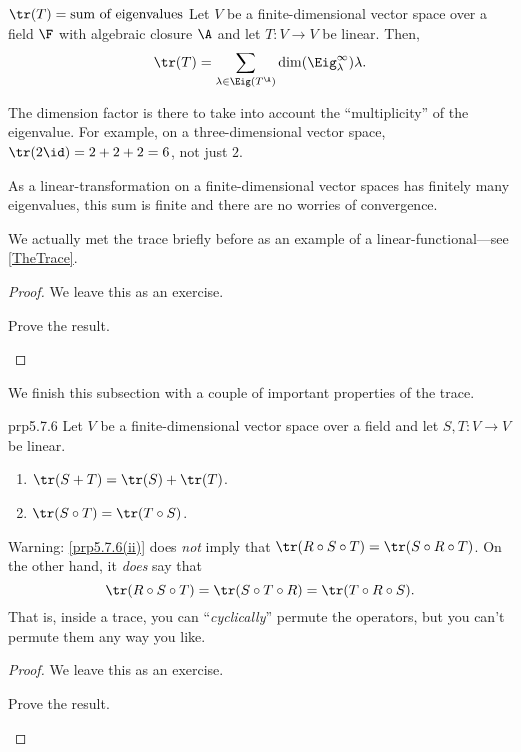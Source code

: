\begin{thm}{$\tr (T)=\text{sum of eigenvalues}$}{}
	Let $V$ be a finite-dimensional vector space over a field $\F$ with algebraic closure $\A$ and let $T\colon V\rightarrow V$ be linear.  Then,
	\begin{equation}
		\tr (T)=\sum _{\lambda \in \Eig (T^{\A})}\dim (\Eig _{\lambda}^{\infty})\lambda .
	\end{equation}
	\begin{rmk}
		The dimension factor is there to take into account the ``multiplicity'' of the eigenvalue.  For example, on a three-dimensional vector space, $\tr (2\id )=2+2+2=6$, not just $2$.
	\end{rmk}
	\begin{rmk}
		As a linear-transformation on a finite-dimensional vector spaces has finitely many eigenvalues, this sum is finite and there are no worries of convergence.
	\end{rmk}
	\begin{rmk}
		We actually met the trace briefly before as an example of a linear-functional---see \cref{TheTrace}.
	\end{rmk}
	\begin{proof}
		We leave this as an exercise.
		\begin{exr}[breakable=false]{}{}
			Prove the result.
		\end{exr}
	\end{proof}
\end{thm}
We finish this subsection with a couple of important properties of the trace.
\begin{prp}{}{prp5.7.6}
	Let $V$ be a finite-dimensional vector space over a field and let $S,T\colon V\rightarrow V$ be linear.
	\begin{enumerate}
		\item \label{prp5.7.6(i)}$\tr (S+T)=\tr (S)+\tr (T)$.
		\item \label{prp5.7.6(ii)}$\tr (S\circ T)=\tr (T\circ S)$.
	\end{enumerate}
	\begin{rmk}
		Warning:  \cref{prp5.7.6(ii)} does \emph{not} imply that $\tr (R\circ S\circ T)=\tr (S\circ R\circ T)$.  On the other hand, it \emph{does} say that
		\begin{equation}
			\tr (R\circ S\circ T)=\tr (S\circ T\circ R)=\tr (T\circ R\circ S).
		\end{equation}
		That is, inside a trace, you can ``\emph{cyclically}'' permute the operators, but you can't permute them any way you like.
	\end{rmk}
	\begin{proof}
		We leave this as an exercise.
		\begin{exr}[breakable=false]{}{}
			Prove the result.
		\end{exr}
	\end{proof}
\end{prp}

